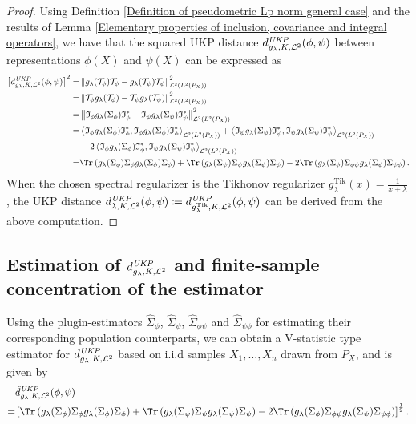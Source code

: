 \documentclass{article} %
\newcommand{\I}{\mathfrak{I}}
\newcommand{\repone}{\phi}
\newcommand{\reptwo}{\psi}
\newcommand{\Sone}{\Sigma_{\repone}}
\newcommand{\Stwo}{\Sigma_{\reptwo}}
\newcommand{\Sonetwo}{\Sigma_{\repone \reptwo}}
\newcommand{\Stwoone}
{\Sigma_{\reptwo \repone}}
\newcommand{\Sonehat}{\hat{\Sigma}_{\repone}}
\newcommand{\Stwohat}{\hat{\Sigma}_{\reptwo}}
\newcommand{\Sonetwohat}{\hat{\Sigma}_{\repone \reptwo}}
\newcommand{\Stwoonehat}
{\hat{\Sigma}_{\reptwo \repone}}
\newcommand{\Tone}{\mathcal{T}_{\repone}}
\newcommand{\Ttwo}{\mathcal{T}_{\reptwo}}
\newcommand{\Irepone}{\I_{\repone}}
\newcommand{\Ireptwo}{\I_{\reptwo}}
\newcommand{\Ireponead}{\Irepone^{*}}
\newcommand{\Ireptwoad}{\Ireptwo^{*}}
\newcommand{\gl}{g_{\lambda}}
\newcommand{\glTik}{\gl^{\operatorname{Tik}}}
\newcommand{\norm}[1]{\left\|#1\right\|}
\newcommand{\inprod}[1]{\left \langle #1 \right\rangle}
\newcommand{\LPtwo}{L^{2}(P_{X})}
\newcommand{\HStwo}{\mathcal{L}^{2}(\LPtwo)}
\newcommand{\metricstname}{UKP }
\newcommand{\dtwo}{d_{\lambda,K,\mathcal{L}^{2}}^{\emph{\metricstname}}}
\newcommand{\dtwogl}{d_{\gl,K,\mathcal{L}^{2}}^{\emph{\metricstname}}}
\newcommand{\dtwoglhat}{\hat{d}_{\gl,K,\mathcal{L}^{2}}^{\emph{\metricstname}}}
\newcommand{\dtwoglTik}{d_{\glTik,K,\mathcal{L}^{2}}^{\emph{\metricstname}}}
\theoremstyle{plain}
\begin{document}
\begin{proof} Using Definition \ref{Definition of pseudometric Lp norm general case} and the results of Lemma \ref{Elementary properties of inclusion, covariance and integral operators}, we have that the squared \metricstname distance $\dtwogl(\repone,\reptwo)$ between representations $\repone(X)$ and $\reptwo(X)$ can be expressed as 
\[
\begin{aligned}
     \left[\dtwogl(\repone,\reptwo)\right]^{2} =& \norm{\gl(\Tone) \Tone - \gl(\Ttwo) \Ttwo}_{\HStwo}^{2} \\
     =& \norm{ \Tone \gl(\Tone) -  \Ttwo \gl(\Ttwo)}_{\HStwo}^{2} \\
     =& \norm{ \Irepone \gl(\Sone) \Ireponead -  \Ireptwo \gl(\Stwo) \Ireptwoad }_{\HStwo}^{2}\\
     =& \inprod{\Irepone \gl(\Sone) \Ireponead  , \Irepone \gl(\Sone) \Ireponead }_{\HStwo} + \inprod{\Ireptwo \gl(\Stwo) \Ireptwoad ,   \Ireptwo \gl(\Stwo) \Ireptwoad }_{\HStwo} \\
     &- 2 \inprod{\Irepone \gl(\Sone) \Ireponead , \Ireptwo \gl(\Stwo) \Ireptwoad }_{\HStwo}\\
     =& \Tr\left(\gl(\Sone)\Sone\gl(\Sone)\Sone\right) + \Tr\left(\gl(\Stwo)\Stwo\gl(\Stwo)\Stwo\right)-2\Tr\left(\gl(\Sone)\Sonetwo\gl(\Stwo)\Stwoone\right).
\end{aligned}
\]
When the chosen spectral regularizer is the Tikhonov regularizer $\glTik(x) = \frac{1}{x+\lambda}$, the UKP distance $ \dtwo (\repone,\reptwo) \coloneqq  \dtwoglTik(\repone,\reptwo)$ can be derived from the above computation.
\end{proof}

\subsection{Estimation of $\dtwogl$ and finite-sample concentration of the estimator}

Using the plugin-estimators $\Sonehat$, $\Stwohat$, $\Sonetwohat$ and $\Stwoonehat$ for estimating their corresponding population counterparts, we can obtain a V-statistic type estimator for $\dtwogl$  based on i.i.d samples $X_1,\dots,X_n$ drawn from $P_X$, and is given by
\begin{equation}\label{Estimator of dtwo general case in terms of covariance operators}
\begin{aligned}
        &\dtwoglhat(\repone,\reptwo)\\
        =& \left[\Tr\left(\gl(\Sone)\Sone\gl(\Sone)\Sone\right) + \Tr\left(\gl(\Stwo)\Stwo\gl(\Stwo)\Stwo\right)-2\Tr\left(\gl(\Sone)\Sonetwo\gl(\Stwo)\Stwoone\right)\right]^{\frac{1}{2}}.
    \end{aligned}
\end{equation}
\end{document}
